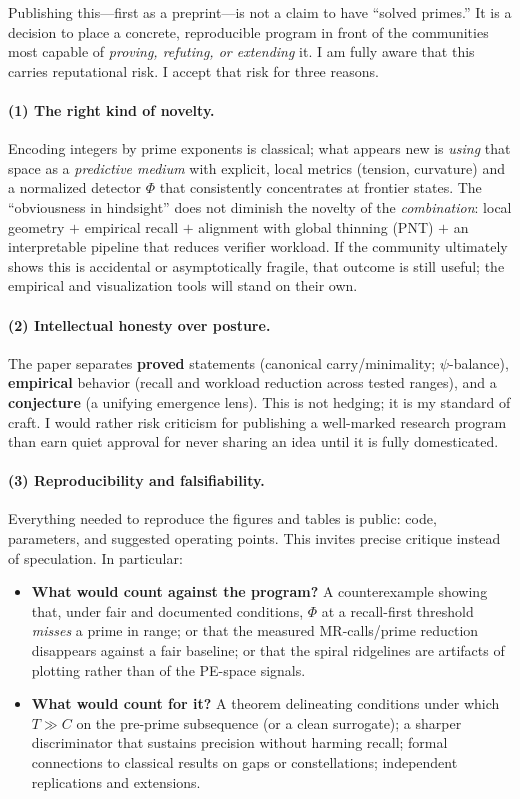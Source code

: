 \documentclass[11pt]{article}
\theoremstyle{plain}
\theoremstyle{definition}
\begin{document}
Publishing this—first as a preprint—is not a claim to have “solved primes.” It is a decision to place a concrete, reproducible program in front of the communities most capable of \emph{proving, refuting, or extending} it. I am fully aware that this carries reputational risk. I accept that risk for three reasons.

\paragraph{(1) The right kind of novelty.}
Encoding integers by prime exponents is classical; what appears new is \emph{using} that space as a \emph{predictive medium} with explicit, local metrics (tension, curvature) and a normalized detector $\Phi$ that consistently concentrates at frontier states. The “obviousness in hindsight” does not diminish the novelty of the \emph{combination}: local geometry $+$ empirical recall $+$ alignment with global thinning (PNT) $+$ an interpretable pipeline that reduces verifier workload. If the community ultimately shows this is accidental or asymptotically fragile, that outcome is still useful; the empirical and visualization tools will stand on their own.

\paragraph{(2) Intellectual honesty over posture.}
The paper separates \textbf{proved} statements (canonical carry/minimality; $\psi$-balance), \textbf{empirical} behavior (recall and workload reduction across tested ranges), and a \textbf{conjecture} (a unifying emergence lens). This is not hedging; it is my standard of craft. I would rather risk criticism for publishing a well-marked research program than earn quiet approval for never sharing an idea until it is fully domesticated.

\paragraph{(3) Reproducibility and falsifiability.}
Everything needed to reproduce the figures and tables is public: code, parameters, and suggested operating points. This invites precise critique instead of speculation. In particular:
\begin{itemize}[leftmargin=1.5em]
  \item \textbf{What would count against the program?} A counterexample showing that, under fair and documented conditions, $\Phi$ at a recall-first threshold \emph{misses} a prime in range; or that the measured MR-calls/prime reduction disappears against a fair baseline; or that the spiral ridgelines are artifacts of plotting rather than of the PE-space signals.
  \item \textbf{What would count for it?} A theorem delineating conditions under which $T\gg C$ on the pre-prime subsequence (or a clean surrogate); a sharper discriminator that sustains precision without harming recall; formal connections to classical results on gaps or constellations; independent replications and extensions.
\end{itemize}
\end{document}
